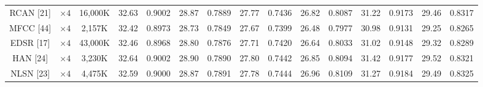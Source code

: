\documentclass[twocolumn]{svjour3}          %
\begin{document}
\begin{table}
\begin{tabular}{|c|c|c|cc|cc|cc|cc|cc|cc|}
RCAN [21]& $\times4$ &16,000K & \multicolumn{1}{c|}{32.63} &0.9002 & \multicolumn{1}{c|}{28.87} & 0.7889&\multicolumn{1}{c|}{27.77} &0.7436 & \multicolumn{1}{c|}{26.82} &0.8087 & \multicolumn{1}{c|}{31.22 } & 0.9173
&\multicolumn{1}{c|}{29.46} &0.8317 \\


MFCC [44]& $\times 4$&2,157K& \multicolumn{1}{c|}{32.42} & 0.8973 & \multicolumn{1}{c|}{28.73} &0.7849 &\multicolumn{1}{c|}{27.67} & 0.7399 & \multicolumn{1}{c|}{26.48} &0.7977 & \multicolumn{1}{c|}{30.98} & 0.9131
&\multicolumn{1}{c|}{29.25} & 0.8265\\



EDSR [17] & $\times4$ &43,000K& \multicolumn{1}{c|}{32.46} &0.8968& \multicolumn{1}{c|}{28.80} &0.7876 &\multicolumn{1}{c|}{27.71} &0.7420 & \multicolumn{1}{c|}{26.64 } & 0.8033 & \multicolumn{1}{c|}{31.02} & 0.9148
&\multicolumn{1}{c|}{29.32} &0.8289  \\

HAN [24] & $\times4$ &3,230K& \multicolumn{1}{c|}{32.64 } &0.9002 & \multicolumn{1}{c|}{28.90} &0.7890 &\multicolumn{1}{c|}{27.80} &0.7442& \multicolumn{1}{c|}{26.85} &0.8094 & \multicolumn{1}{c|}{31.42} &0.9177
&\multicolumn{1}{c|}{29.52} &0.8321 \\

NLSN [23] & $\times4$ &4,475K& \multicolumn{1}{c|}{32.59 } &0.9000 & \multicolumn{1}{c|}{28.87} &0.7891 &\multicolumn{1}{c|}{27.78} &0.7444 & \multicolumn{1}{c|}{26.96} &0.8109 & \multicolumn{1}{c|}{31.27} &0.9184
&\multicolumn{1}{c|}{29.49} &0.8325 \\


\end{tabular}
\end{table}
\end{document}
